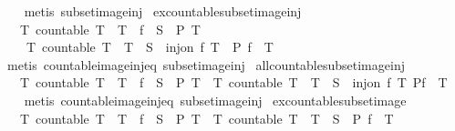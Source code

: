 \begin{isabellebody}
%
\isadelimproof
\ \ %
\endisadelimproof
%
\isatagproof
{}\isamarkupfalse%
\ {\isacharparenleft}metis\ subset{\isacharunderscore}image{\isacharunderscore}inj{\isacharparenright}%
\endisatagproof
{\isafoldproof}%
%
\isadelimproof
\isanewline
%
\endisadelimproof
\isanewline
{}\isamarkupfalse%
\ ex{\isacharunderscore}countable{\isacharunderscore}subset{\isacharunderscore}image{\isacharunderscore}inj{\isacharcolon}\isanewline
\ \ \ {\isachardoublequoteopen}{\isacharparenleft}{\isasymexists}T{\isachardot}\ countable\ T\ {\isasymand}\ T\ {\isasymsubseteq}\ f\ {\isacharbackquote}\ S\ {\isasymand}\ P\ T{\isacharparenright}\ {\isasymlongleftrightarrow}\isanewline
\ \ \ \ {\isacharparenleft}{\isasymexists}T{\isachardot}\ countable\ T\ {\isasymand}\ T\ {\isasymsubseteq}\ S\ {\isasymand}\ inj{\isacharunderscore}on\ f\ T\ {\isasymand}\ P\ {\isacharparenleft}f\ {\isacharbackquote}\ T{\isacharparenright}{\isacharparenright}{\isachardoublequoteclose}\isanewline
%
\isadelimproof
\ \ %
\endisadelimproof
%
\isatagproof
{}\isamarkupfalse%
\ {\isacharparenleft}metis\ countable{\isacharunderscore}image{\isacharunderscore}inj{\isacharunderscore}eq\ subset{\isacharunderscore}image{\isacharunderscore}inj{\isacharparenright}%
\endisatagproof
{\isafoldproof}%
%
\isadelimproof
\isanewline
%
\endisadelimproof
\isanewline
{}\isamarkupfalse%
\ all{\isacharunderscore}countable{\isacharunderscore}subset{\isacharunderscore}image{\isacharunderscore}inj{\isacharcolon}\isanewline
\ \ \ {\isachardoublequoteopen}{\isacharparenleft}{\isasymforall}T{\isachardot}\ countable\ T\ {\isasymand}\ T\ {\isasymsubseteq}\ f\ {\isacharbackquote}\ S\ {\isasymlongrightarrow}\ P\ T{\isacharparenright}\ {\isasymlongleftrightarrow}\ {\isacharparenleft}{\isasymforall}T{\isachardot}\ countable\ T\ {\isasymand}\ T\ {\isasymsubseteq}\ S\ {\isasymand}\ inj{\isacharunderscore}on\ f\ T\ {\isasymlongrightarrow}P{\isacharparenleft}f\ {\isacharbackquote}\ T{\isacharparenright}{\isacharparenright}{\isachardoublequoteclose}\isanewline
%
\isadelimproof
\ \ %
\endisadelimproof
%
\isatagproof
{}\isamarkupfalse%
\ {\isacharparenleft}metis\ countable{\isacharunderscore}image{\isacharunderscore}inj{\isacharunderscore}eq\ subset{\isacharunderscore}image{\isacharunderscore}inj{\isacharparenright}%
\endisatagproof
{\isafoldproof}%
%
\isadelimproof
\isanewline
%
\endisadelimproof
\isanewline
{}\isamarkupfalse%
\ ex{\isacharunderscore}countable{\isacharunderscore}subset{\isacharunderscore}image{\isacharcolon}\isanewline
\ \ \ {\isachardoublequoteopen}{\isacharparenleft}{\isasymexists}T{\isachardot}\ countable\ T\ {\isasymand}\ T\ {\isasymsubseteq}\ f\ {\isacharbackquote}\ S\ {\isasymand}\ P\ T{\isacharparenright}\ {\isasymlongleftrightarrow}\ {\isacharparenleft}{\isasymexists}T{\isachardot}\ countable\ T\ {\isasymand}\ T\ {\isasymsubseteq}\ S\ {\isasymand}\ P\ {\isacharparenleft}f\ {\isacharbackquote}\ T{\isacharparenright}{\isacharparenright}{\isachardoublequoteclose}\isanewline

\end{isabellebody}
